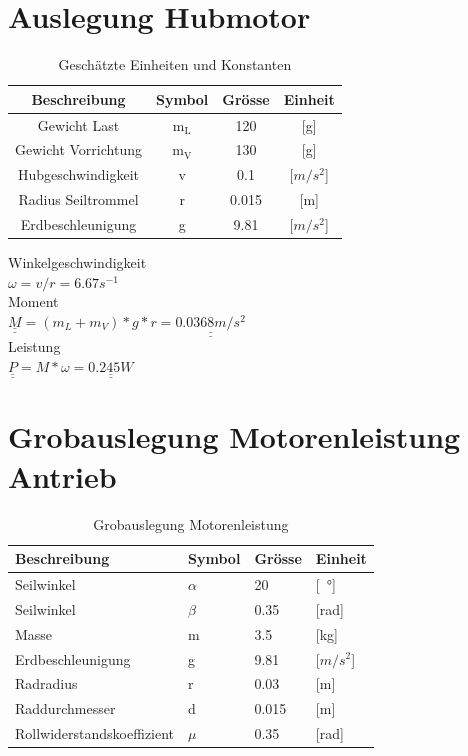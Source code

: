 \documentclass[a4paper]{report}
\begin{document}
\section{Auslegung Hubmotor}
\begin{table}[h!]
	\centering
	\begin{tabular}{|c|c|c|c|}
		\hline
		\textbf{Beschreibung}& \textbf{Symbol} & \textbf{Grösse} & \textbf{Einheit} \\
		\hline
		Gewicht Last& m$_{\text{L}}$ & 120 & [g] \\
		\hline
		Gewicht Vorrichtung& m$_{\text{V}}$ & 130 & [g] \\
		\hline
		Hubgeschwindigkeit& v & 0.1 & [$m/s^2$] \\
		\hline
		Radius Seiltrommel & r & 0.015 & [m]\\
		\hline
		Erdbeschleunigung & g & 9.81 & [$m/s^2$]\\
		\hline
	\end{tabular}
	\caption{Geschätzte Einheiten und Konstanten}
\end{table}
\noindent
Winkelgeschwindigkeit\\
$\omega=v/r=6.67s^{-1}$	\\
Moment\\
$\underline{\underline{M}}=(m_L+m_V)*g*r=\underline{\underline{0.0368m/s^2}}$\\
Leistung	\\
$\underline{\underline{P}}=M*\omega=\underline{\underline{0.245W}}$

\section{Grobauslegung Motorenleistung Antrieb}
\label{ssec:GrobMotor}
\begin{table}[h!]
	\begin{tabular}{|p{}|p{}|p{}|p{}|}
		\hline
		\textbf{Beschreibung} & \textbf{Symbol} & \textbf{Grösse}& \textbf{Einheit}  \\
		\hline
		Seilwinkel & $\alpha$ & 20 & [\SI{}{\degree}] \\
		\hline
		Seilwinkel & $\beta$ & 0.35 & [rad] \\
		\hline
		Masse & m & 3.5 & [kg] \\
		\hline
		Erdbeschleunigung & g & 9.81 & [$m/s^2$] \\
		\hline
		Radradius & r & 0.03 & [m] \\
		\hline
		Raddurchmesser & d & 0.015 & [m] \\
		\hline
		Rollwiderstandskoeffizient & $\mu$ & 0.35 & [rad] \\
		\hline
	\end{tabular}
	\caption{Grobauslegung Motorenleistung}
	\label{tbl:Motorenleistung}
\end{table}
\end{document}
